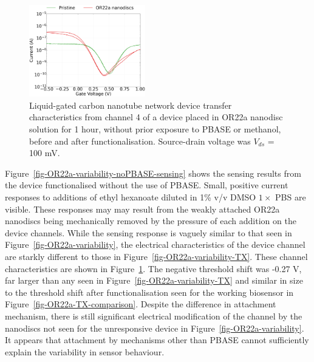 \documentclass[
  a4paper,
]{scrbook}
\begin{document}
\begin{figure}

{\centering \includegraphics[width=0.45\textwidth,height=\textheight]{figures/ch8/Q4C8_ch4_without_gate_current.png}

}

\caption{\label{fig-OR22a-variability-TX-comparison}Liquid-gated carbon
nanotube network device transfer characteristics from channel 4 of a
device placed in OR22a nanodisc solution for 1 hour, without prior
exposure to PBASE or methanol, before and after functionalisation.
Source-drain voltage was \(V_{ds}\) = 100 mV.}

\end{figure}

Figure~\ref{fig-OR22a-variability-noPBASE-sensing} shows the sensing
results from the device functionalised without the use of PBASE. Small,
positive current responses to additions of ethyl hexanoate diluted in
1\% v/v DMSO \(1 \times\) PBS are visible. These responses may may
result from the weakly attached OR22a nanodiscs being mechanically
removed by the pressure of each addition on the device channels. While
the sensing response is vaguely similar to that seen in
Figure~\ref{fig-OR22a-variability}, the electrical characteristics of
the device channel are starkly different to those in
Figure~\ref{fig-OR22a-variability-TX}. These channel characteristics are
shown in Figure~\ref{fig-OR22a-variability-TX-comparison}. The negative
threshold shift was -0.27 V, far larger than any seen in
Figure~\ref{fig-OR22a-variability-TX} and similar in size to the
threshold shift after functionalisation seen for the working biosensor
in Figure~\ref{fig-OR22a-TX-comparison}. Despite the difference in
attachment mechanism, there is still significant electrical modification
of the channel by the nanodiscs not seen for the unresponsive device in
Figure~\ref{fig-OR22a-variability}. It appears that attachment by
mechanisms other than PBASE cannot sufficiently explain the variability
in sensor behaviour.
\end{document}
